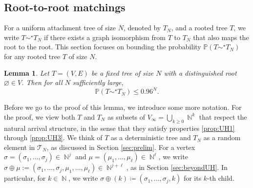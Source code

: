 \documentclass[11pt]{article}
\numberwithin{equation}{section}
\DeclareMathOperator{\N}{\mathbb{N}} %
\newcommand{\p}{\mathbb{P}} %
\newcommand{\invisible}[1]{}
\newcommand{\basc}[1]{{\color{red}{ \bf [~Bas:\ }\emph{#1}\textbf{~]}}}
\newtheorem{lemma}[theorem]{Lemma}
\theoremstyle{definition}
\begin{document}
\subsection{Root-to-root matchings}\label{sec:roottoroot}

For a uniform attachment tree of size $N$, denoted by $T_N$, and a rooted tree $T$, we write $T\sim^\star  T_N$ if there exists a {graph isomorphism} from $T$ to $T_N$ that also maps the root to the root. This section focuses on bounding the probability
$\p \left(T\sim^\star  T_N \right)$ for any rooted tree $T$ of size $N$. 


\begin{lemma}\label{lemma:matchprob}
    Let $T=(V,E)$ be a fixed tree of size $N$ with a distinguished root $\varnothing \in V$.  Then for all $N$ sufficiently large,
    \begin{equation*}
        \p \left( T \sim^{\star} T_N \right) \leq 0.96^N.
    \end{equation*}
    \invisible{ 
    \basc{Based on improvement of Claim~\ref{claim:1}, this upper bound can now be improved to $o(\sqrt{c}^N)$ for any $c>11/2$.}
}
\end{lemma}

Before we go to the proof of this lemma, we introduce some more notation. For the proof, we view both $T$ and $T_N$ as subsets of $V_\infty = \bigcup_{k\geq 0}\N^k$ that respect the natural arrival structure, in the sense that they satisfy properties \ref{prop:UH1} through \ref{prop:UH3}. We think of $T$ as a deterministic tree and $T_N$ as a random element in $\mathcal{T}_N$, as discussed in Section \ref{sec:prelim}.
 For a vertex $\sigma=(\sigma_1,\ldots,\sigma_j)\in \N^j$ and $\mu=(\mu_1,\ldots,\mu_\ell) \in \N^\ell$, we write $\sigma\oplus\mu := (\sigma_1,\ldots,\sigma_j,\mu_1,\ldots,\mu_\ell) \in \N^{j+\ell}$, as in Section \ref{sec:beyondUH}. In particular, for $k\in \N$, we write $\sigma \oplus (k) \coloneqq (\sigma_1,\ldots,\sigma_j,k)$ for its $k$-th child.
\end{document}
